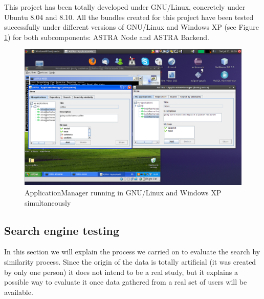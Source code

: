 This project has been totally developed under GNU/Linux, concretely under
Ubuntu 8.04 and 8.10.
All the bundles created for this project have been tested successfully under
different versions of GNU/Linux and Windows XP (see Figure
\ref{img:testing-win-linux}) for both subcomponents: ASTRA Node and ASTRA
Backend.

\begin{figure}
 \begin{center}
 \includegraphics[scale=0.3]{screenshots/am-linux-w32.png}
 \end{center}
 \caption{\label{img:testing-win-linux}ApplicationManager running in GNU/Linux
 and Windows XP simultaneously}
\end{figure}

\subsection{Search engine testing}
\label{subsec:testing-search-engine}

In this section we will explain the process we carried on to evaluate the
search by similarity process. Since the origin of the data is totally
artificial (it was created by only one person) it does not intend to be a real
study, but it explains a possible way to evaluate it once data gathered from a
real set of users will be available.

